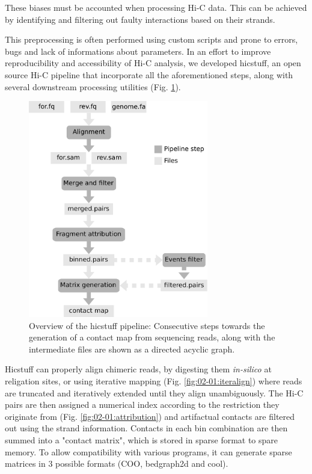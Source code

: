 These biases must be accounted when processing Hi-C data. This can be achieved by identifying and filtering out faulty interactions based on their strands.

This preprocessing is often performed using custom scripts and prone to errors, bugs and lack of informations about parameters. In an effort to improve reproducibility and accessibility of Hi-C analysis, we developed hicstuff, an open source Hi-C pipeline that incorporate all the aforementioned steps, along with several downstream processing utilities (Fig. \ref{fig:02-01:pipeline}).

\begin{figure}[htb]
    \includegraphics[width=0.7\textwidth]{Parts/Part02/gfx/hicstuff/pipeline.pdf}
    \caption[Overview of the hicstuff pipeline.]{Overview of the hicstuff pipeline: Consecutive steps towards the generation of a contact map from sequencing reads, along with the intermediate files are shown as a directed acyclic graph.}
    \label{fig:02-01:pipeline}
\end{figure}

Hicstuff can properly align chimeric reads, by digesting them \textit{in-silico} at religation sites, or using iterative mapping (Fig. \ref{fig:02-01:iteralign}) where reads are truncated and iteratively extended until they align unambiguously. The Hi-C pairs are then assigned a numerical index according to the restriction they originate from (Fig. \ref{fig:02-01:attribution}) and artifactual contacts are filtered out using the strand information. Contacts in each bin combination are then summed into a "contact matrix", which is stored in sparse format to spare memory. To allow compatibility with various programs, it can generate sparse matrices in 3 possible formats (COO, bedgraph2d and cool).

